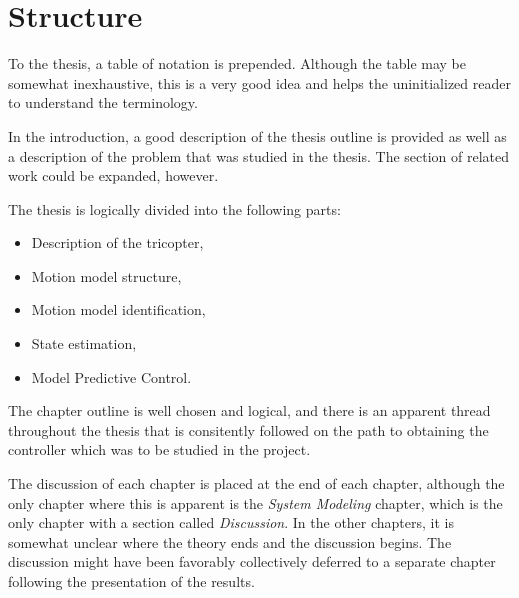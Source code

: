 \section{Structure}
\label{sec:structure}
	To the thesis, a table of notation is prepended. 
	Although the table may be somewhat inexhaustive, this is
	a very good idea and helps the uninitialized reader to understand the
	terminology.
	
	In the introduction, a good description of the thesis outline is provided
	as well as a description of the problem that was studied in the thesis.
	The section of related work could be expanded, however.

	The thesis is logically divided into the following parts:
	\begin{itemize}
		\item Description of the tricopter,
		\item Motion model structure,
		\item Motion model identification,
		\item State estimation,
		\item Model Predictive Control.
	\end{itemize}
	
	The chapter outline is well chosen and logical, and there is an apparent
	thread throughout the thesis that is consitently followed on the path 
	to obtaining the controller which was to be studied in the project.
	
	The discussion of each chapter is placed at the end of each chapter,
	although the only chapter where this is apparent is the \textit{System Modeling}
	chapter, which is the only chapter with a section called \textit{Discussion}.
	In the other chapters, it is somewhat unclear where the theory ends and the
	discussion begins. The discussion might have been favorably collectively deferred to 
	a separate chapter following the presentation of the results.
